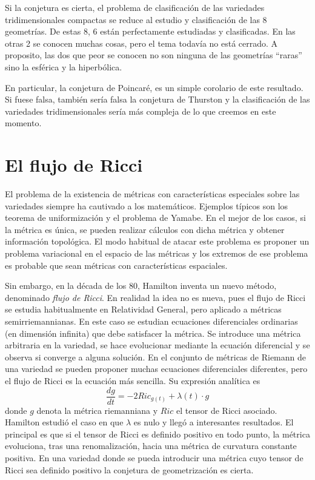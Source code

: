 \documentclass[a4paper, 12pt]{article}
\begin{document}
Si la conjetura es cierta, el problema de clasificación de las variedades tridimensionales compactas se reduce al estudio y clasificación de las 8 geometrías.  De estas 8, 6 están perfectamente estudiadas y clasificadas.  En las otras 2 se conocen muchas cosas, pero el tema todavía no está cerrado. A proposito, las dos que peor se conocen no  son ninguna de las geometrías ``raras'' sino la esférica y la hiperbólica.


En particular, la conjetura de Poincaré, es un simple corolario de este resultado.  Si fuese  falsa, también sería falsa la conjetura de Thurston y la clasificación de las variedades tridimensionales sería más compleja de lo que creemos en este momento.

\newpage

\section*{El flujo de Ricci}

El problema de la existencia de métricas con características especiales sobre las variedades siempre ha cautivado a los matemáticos. Ejemplos típicos son los teorema de uniformización y el problema de Yamabe.  En el mejor de los casos, si la métrica es única, se pueden realizar cálculos con dicha métrica y obtener información topológica.  El modo habitual de atacar este problema es proponer un problema variacional en el espacio de las métricas y los extremos de ese problema es probable que sean métricas con características espaciales.

Sin embargo, en la década de los 80, Hamilton inventa un nuevo método, denominado {\it flujo de Ricci}. En realidad la idea no es nueva, pues el flujo de Ricci se estudia habitualmente en Relatividad General, pero aplicado a métricas semirriemannianas. En este caso se estudian ecuaciones diferenciales ordinarias (en dimensión infinita) que debe satisfacer la métrica. Se introduce  una métrica arbitraria en la variedad,  se hace evolucionar mediante la ecuación diferencial y se observa si converge a alguna solución.  En el conjunto de métricas de Riemann de una variedad se pueden proponer muchas ecuaciones diferenciales diferentes, pero el flujo de Ricci es la ecuación más sencilla.  Su expresión analítica es
$$
\frac{d g}{d t}=-2Ric_{g(t)} +\lambda(t) \cdot g
$$
donde $g$ denota la métrica riemanniana y $Ric$ el tensor de Ricci asociado. 
Hamilton estudió el caso en que $\lambda$ es nulo y llegó a interesantes resultados.  El principal es que si el tensor de Ricci es definido positivo en todo punto, la métrica evoluciona, tras una renomalización, hacia una métrica de curvatura constante positiva.  En una variedad donde se pueda introducir una métrica cuyo tensor de Ricci sea definido positivo la conjetura de geometrización es cierta.  
\end{document}
